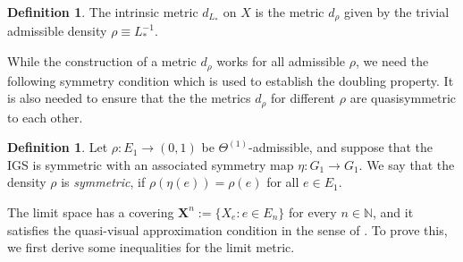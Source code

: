 \documentclass{amsart}
\numberwithin{equation}{section}
\theoremstyle{definition}
\newtheorem{definition}[equation]{Definition}
\theoremstyle{remark}
\newcommand{\N}{\mathbb{N}}
\begin{document}
\begin{definition}\label{def:intrinsicmetric}
The intrinsic metric \(d_{L_*}\) on \(X\) is the metric \(d_\rho\) given by the trivial admissible density \(\rho\equiv L_*^{-1}\).
\end{definition}

While the construction of a metric $d_\rho$ works for all admissible $\rho$, we need the following symmetry condition which is used to establish the doubling property. It is also needed to ensure that the the metrics $d_\rho$ for different $\rho$ are quasisymmetric to each other.

\begin{definition}
    Let \(\rho\colon E_1\to (0,1)\) be \(\Theta^{(1)}\)-admissible, and suppose that the IGS is symmetric with an associated symmetry map \(\eta\colon G_1\to G_1\). We say that the density \(\rho\) is \emph{symmetric}, if
        \(
            \rho(\eta(e))=\rho(e)
        \)
    for all \(e\in E_1\).
\end{definition}

The limit space  has a covering $\mathbf{X}^n := \{X_e : e\in E_n\}$ for every $n\in \N$, and it satisfies the quasi-visual approximation condition in the sense of \cite[Definition 2.1]{bonkmeyer}. To prove this, we first derive some inequalities for the limit metric.
\end{document}
